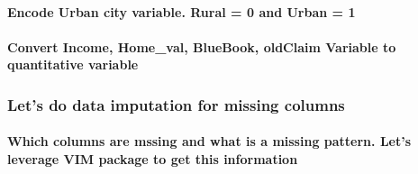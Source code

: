 \documentclass[]{article}
\newenvironment{Shaded}{\begin{snugshade}}{\end{snugshade}}
\newcommand{\DecValTok}[1]{\textcolor[rgb]{0.00,0.00,0.81}{#1}}
\newcommand{\KeywordTok}[1]{\textcolor[rgb]{0.13,0.29,0.53}{\textbf{#1}}}
\newcommand{\NormalTok}[1]{#1}
\newcommand{\OperatorTok}[1]{\textcolor[rgb]{0.81,0.36,0.00}{\textbf{#1}}}
\newcommand{\StringTok}[1]{\textcolor[rgb]{0.31,0.60,0.02}{#1}}
\let\oldparagraph\paragraph
\renewcommand{\paragraph}[1]{\oldparagraph{#1}\mbox{}}
\begin{document}
\hypertarget{encode-urban-city-variable.-rural-0-and-urban-1}{%
\paragraph{\texorpdfstring{\textbf{Encode Urban city variable. Rural = 0
and Urban =
1}}{Encode Urban city variable. Rural = 0 and Urban = 1}}\label{encode-urban-city-variable.-rural-0-and-urban-1}}

\begin{Shaded}
\end{Shaded}

\hypertarget{convert-income-home_val-bluebook-oldclaim-variable-to-quantitative-variable}{%
\paragraph{\texorpdfstring{\textbf{Convert Income, Home\_val, BlueBook,
oldClaim Variable to quantitative
variable}}{Convert Income, Home\_val, BlueBook, oldClaim Variable to quantitative variable}}\label{convert-income-home_val-bluebook-oldclaim-variable-to-quantitative-variable}}

\hypertarget{lets-do-data-imputation-for-missing-columns}{%
\subsubsection{\texorpdfstring{\textbf{Let's do data imputation for
missing
columns}}{Let's do data imputation for missing columns}}\label{lets-do-data-imputation-for-missing-columns}}

\hypertarget{which-columns-are-mssing-and-what-is-a-missing-pattern.-lets-leverage-vim-package-to-get-this-information}{%
\paragraph{Which columns are mssing and what is a missing pattern. Let's
leverage VIM package to get this
information}\label{which-columns-are-mssing-and-what-is-a-missing-pattern.-lets-leverage-vim-package-to-get-this-information}}
\end{document}
